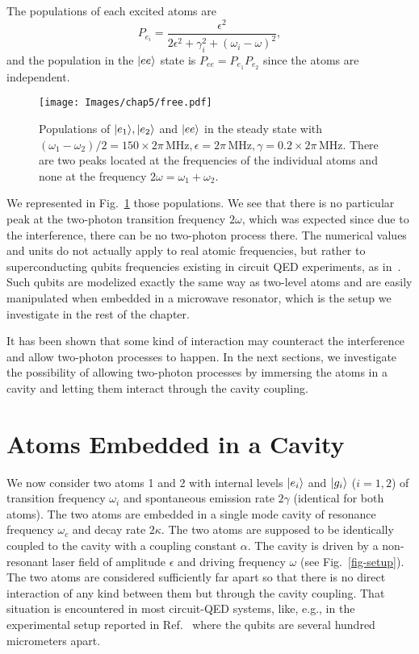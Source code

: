 The populations of each excited atoms are
\[ P_{e_i} =  \frac{\epsilon^2}{2\epsilon^2+ \gamma_i^2 + (\omega_i-\omega)^2} , \]
and the population in the $| ee \rangle$ state is $P_{ee}= P_{e_1}  P_{e_2}$ since the atoms are independent.

\begin{figure}
    \center
    \texttt{[image: Images/chap5/free.pdf]}
    \caption[Populations in the steady-state]{Populations of $| e_1 \rangle, | e_2 \rangle$ and $| ee \rangle$ in the steady state with $(\omega_1 - \omega_2)/2 = 150 \times 2\pi\,\mbox{MHz}, \epsilon=2\pi\,\mbox{MHz}, \gamma=0.2  \times 2\pi\,\mbox{MHz}$. There are two peaks located at the frequencies of the individual atoms and none at the frequency $2 \omega = \omega_1 + \omega_2$.}
    \label{fig-free}
\end{figure}

We represented in Fig.~\ref{fig-free} those populations. We see that there is no particular peak at the two-photon transition frequency $2\omega$, which was expected since due to the interference, there can be no two-photon process there. The numerical values and units do not actually apply to real atomic frequencies, but rather to superconducting qubits frequencies existing in circuit QED experiments, as in~\cite{Fin09}. Such qubits are modelized exactly the same way as two-level atoms and are easily manipulated when embedded in a microwave resonator, which is the setup we investigate in the rest of the chapter.

It has been shown that some kind of interaction may counteract the interference and allow two-photon processes to happen\cite{Var92}. In the next sections, we investigate the possibility of allowing two-photon processes by immersing the atoms in a cavity and letting them interact through the cavity coupling.

\section{Atoms Embedded in a Cavity} \label{sec-QEDMod}

We now consider two atoms 1 and 2 with internal levels $| e_i \rangle$ and $| g_i \rangle$ ($i=1,2$) of transition frequency $\omega_i$ and spontaneous emission rate $2\gamma$ (identical for both atoms). The two atoms are embedded in a single mode cavity of resonance frequency $\omega_c$ and decay rate $2\kappa$. The two atoms are supposed to be identically coupled to the cavity with a coupling constant $\alpha$. The cavity is driven by a non-resonant laser field of amplitude $\epsilon$ and driving frequency $\omega$ (see Fig.~\ref{fig-setup}). The two atoms are considered sufficiently far apart so that there is no direct interaction of any kind between them but through the cavity coupling. That situation is encountered in most circuit-QED systems, like, e.g., in the experimental setup reported in Ref.~\cite{Fin09} where the qubits are several hundred micrometers apart.

